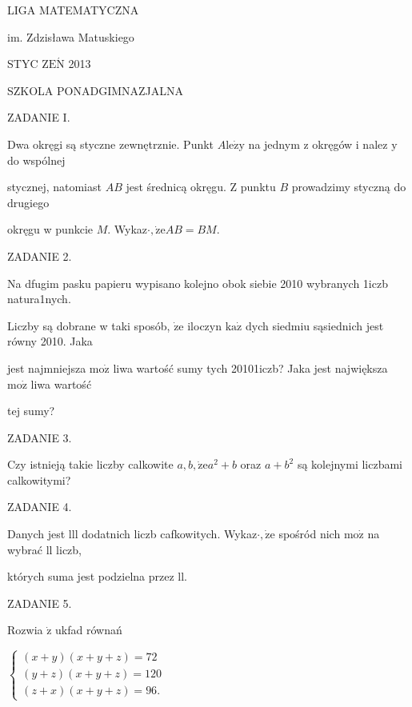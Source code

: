 \documentclass[a4paper,12pt]{article}
\begin{document}
LIGA MATEMATYCZNA

im. Zdzisława Matuskiego

STYC Z$\mathrm{E}\acute{\mathrm{N}}$ 2013

SZKOLA PONADGIMNAZJALNA

ZADANIE I.

Dwa okręgi są styczne zewnętrznie. Punkt $A\mathrm{l}\mathrm{e}\dot{\mathrm{z}}\mathrm{y}$ na jednym z okręgów i nalez $\mathrm{y}$ do wspólnej

stycznej, natomiast $AB$ jest średnicą okręgu. $\mathrm{Z}$ punktu $B$ prowadzimy styczną do drugiego

okręgu w punkcie $M$. Wykaz$\cdot, \dot{\mathrm{z}}\mathrm{e}AB=BM.$

ZADANIE 2.

Na dfugim pasku papieru wypisano kolejno obok siebie 2010 wybranych 1iczb natura1nych.

Liczby są dobrane w taki sposób, $\dot{\mathrm{z}}\mathrm{e}$ iloczyn $\mathrm{k}\mathrm{a}\dot{\mathrm{z}}$ dych siedmiu sąsiednich jest równy 2010. Jaka

jest najmniejsza $\mathrm{m}\mathrm{o}\dot{\mathrm{z}}$ liwa wartość sumy tych 20101iczb? Jaka jest największa $\mathrm{m}\mathrm{o}\dot{\mathrm{z}}$ liwa wartość

tej sumy?

ZADANIE 3.

Czy istnieją takie liczby calkowite $a, b, \dot{\mathrm{z}}\mathrm{e}a^{2}+b$ oraz $a+b^{2}$ są kolejnymi liczbami calkowitymi?

ZADANIE 4.

Danych jest lll dodatnich liczb cafkowitych. Wykaz$\cdot, \dot{\mathrm{z}}\mathrm{e}$ spośród nich $\mathrm{m}\mathrm{o}\dot{\mathrm{z}}$ na wybrać ll liczb,

których suma jest podzielna przez ll.

ZADANIE 5.

Rozwia $\dot{\mathrm{z}}$ ukfad równań

$\left\{\begin{array}{l}
(x+y)(x+y+z)=72\\
(y+z)(x+y+z)=120\\
(z+x)(x+y+z)=96.
\end{array}\right.$
\end{document}

